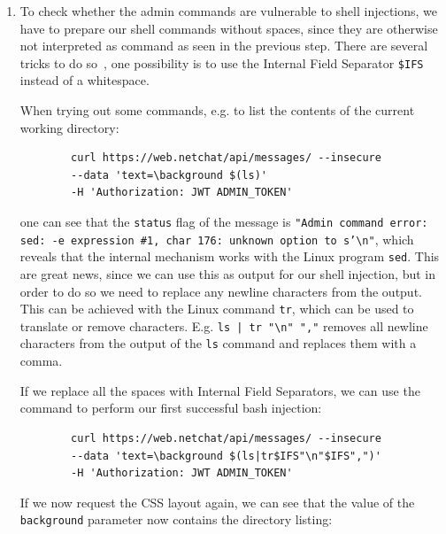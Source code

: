 \documentclass[12pt,a4paper]{article}
\newcommand{\code}[1]{\texttt{#1}}
\begin{document}
\begin{enumerate}
	 You can also issue the command within the web application using the command \code{\textbackslash background helloworld}. Check that the value of the attribute \code{background} in the CSS response now really is \code{helloworld}.
	 
	 An additional, important observation is, that values containing white space like \code{hello world} are not working.
	 
	 \item To check whether the admin commands are vulnerable to shell injections, we have to prepare our shell commands without spaces, since they are otherwise not interpreted as command as seen in the previous step. There are several tricks to do so~\cite{whitespace}, one possibility is to use the Internal Field Separator \code{\$IFS} instead of a whitespace.
	 
	 When trying out some commands, e.g. to list the contents of the current working directory:
	 \begin{verbatim}
	 	curl https://web.netchat/api/messages/ --insecure
	 	--data 'text=\background $(ls)'
	 	-H 'Authorization: JWT ADMIN_TOKEN'
	 \end{verbatim}
	 
	 one can see that the \code{status} flag of the message is \code{"Admin command error: sed: -e expression \#1, char 176: unknown option to s'\textbackslash n"}, which reveals that the internal mechanism works with the Linux program \code{sed}. This are great news, since we can use this as output for our shell injection, but in order to do so we need to replace any newline characters from the output. This can be achieved with the Linux command \code{tr}, which can be used to translate or remove characters. E.g. \code{ls | tr "\textbackslash n" ","} removes all newline characters from the output of the \code{ls} command and replaces them with a comma.
	 
	 If we replace all the spaces with Internal Field Separators, we can use the command to perform our first successful bash injection:
	 
	 \begin{verbatim}
	 	curl https://web.netchat/api/messages/ --insecure
	 	--data 'text=\background $(ls|tr$IFS"\n"$IFS",")'
	 	-H 'Authorization: JWT ADMIN_TOKEN'
	 \end{verbatim}
	 
	 If we now request the CSS layout again, we can see that the value of the \code{background} parameter now contains the directory listing:
	 

\end{enumerate}
\end{document}
